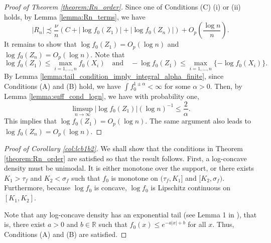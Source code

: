 \documentclass[12pt,letterpaper, twoside, openany]{article}
\theoremstyle{plain}
\begin{document}
\begin{proof}[Proof of Theorem \ref{theorem:Rn_order}]
Since one of Conditions (C) (i) or (ii) holds, by Lemma \ref{lemma:Rn_terms}, we have
\begin{equation*}
    |R_n| \precsim \frac{\nu}{n}(C + |\log f_0(Z_1)| + |\log f_0(Z_n)|) + O_p\left(\frac{\log n}{n}\right).
\end{equation*}
It remains to show that $\log f_0(Z_1) = O_p(\log n)$ and $\log f_0(Z_n) = O_p(\log n)$. Note that
\begin{equation*}
\log f_0(Z_1) \leq \max_{i=1,\ldots,n} f_0(X_i) \quad \text{and} \quad - \log f_0(Z_1) \leq \max_{i=1,\ldots,n} \{ -\log f_0(X_i) \}.
\end{equation*}
By Lemma \ref{lemma:tail_condition_imply_integral_alpha_finite}, since Conditions (A) and (B) hold, we have $\int f_0^{1\pm \alpha} < \infty$ for some $\alpha > 0$. Then, by Lemma \ref{lemma:suff_cond_logn}, we have with  probability one,
\begin{equation*}
\limsup_{n \rightarrow \infty} \left| \log f_0(Z_1) \right| (\log n)^{-1} \leq \frac{2}{\alpha}.
\end{equation*}
This implies that $\log f_0(Z_1) = O_p(\log n)$. 
The same argument also leads to $\log f_0(Z_n) = O_p(\log n)$. 
\end{proof}




\begin{proof}[Proof of Corollary \ref{col:lcb1b2}]
We shall show that the conditions in Theorem \ref{theorem:Rn_order} are satisfied so that the result follows. First, a log-concave density must be unimodal. It is either monotone over the support, or there exists $K_1 > \tau_f$ and $K_2 < \sigma_f$ such that $f_0$ is monotone on $(\tau_f, K_1]$ and $[K_2,\sigma_f)$. Furthermore, because $\log f_0$ is concave, $\log f_0$ is Lipschitz continuous on $[K_1, K_2]$. 

Note that any log-concave density has an exponential tail (see Lemma 1 in \cite{cule2010theoretical}), that is, there exist $a > 0 $ and $b \in \mathbb{R}$ such that $f_0(x) \leq e^{-a|x| + b}$ for all $x$. Thus, Conditions (A) and (B) are satisfied.
\end{proof}
\end{document}
